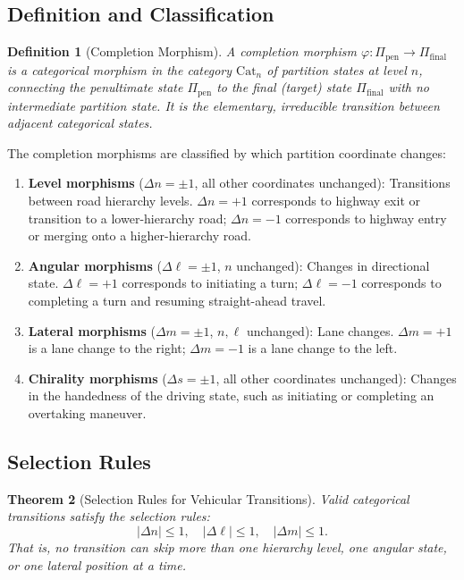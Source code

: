 \documentclass[twocolumn,10pt]{article}
\newtheorem{theorem}{Theorem}[section]
\newtheorem{definition}[theorem]{Definition}
\begin{document}
\subsection{Definition and Classification}

\begin{definition}[Completion Morphism]\label{def:morphism}
A completion morphism $\varphi: \Pi_{\mathrm{pen}} \to \Pi_{\mathrm{final}}$ is a categorical morphism in the category $\mathrm{Cat}_n$ of partition states at level $n$, connecting the penultimate state $\Pi_{\mathrm{pen}}$ to the final (target) state $\Pi_{\mathrm{final}}$ with no intermediate partition state. It is the elementary, irreducible transition between adjacent categorical states.
\end{definition}

The completion morphisms are classified by which partition coordinate changes:

\begin{enumerate}
    \item \textbf{Level morphisms} ($\Delta n = \pm 1$, all other coordinates unchanged): Transitions between road hierarchy levels. $\Delta n = +1$ corresponds to highway exit or transition to a lower-hierarchy road; $\Delta n = -1$ corresponds to highway entry or merging onto a higher-hierarchy road.

    \item \textbf{Angular morphisms} ($\Delta \ell = \pm 1$, $n$ unchanged): Changes in directional state. $\Delta \ell = +1$ corresponds to initiating a turn; $\Delta \ell = -1$ corresponds to completing a turn and resuming straight-ahead travel.

    \item \textbf{Lateral morphisms} ($\Delta m = \pm 1$, $n, \ell$ unchanged): Lane changes. $\Delta m = +1$ is a lane change to the right; $\Delta m = -1$ is a lane change to the left.

    \item \textbf{Chirality morphisms} ($\Delta s = \pm 1$, all other coordinates unchanged): Changes in the handedness of the driving state, such as initiating or completing an overtaking maneuver.
\end{enumerate}

\subsection{Selection Rules}

\begin{theorem}[Selection Rules for Vehicular Transitions]\label{thm:selection}
Valid categorical transitions satisfy the selection rules:
\begin{equation}\label{eq:selection}
|\Delta n| \leq 1, \quad |\Delta \ell| \leq 1, \quad |\Delta m| \leq 1.
\end{equation}
That is, no transition can skip more than one hierarchy level, one angular state, or one lateral position at a time.
\end{theorem}
\end{document}
